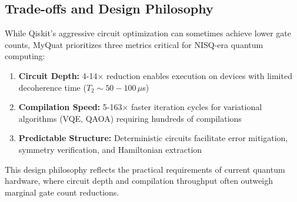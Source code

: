 \subsection{Trade-offs and Design Philosophy}

While Qiskit's aggressive circuit optimization can sometimes achieve lower gate 
counts, MyQuat prioritizes three metrics critical for NISQ-era quantum computing:

\begin{enumerate}
\item \textbf{Circuit Depth:} 4-14$\times$ reduction enables execution on 
      devices with limited decoherence time ($T_2 \sim 50-100\,\mu$s)
\item \textbf{Compilation Speed:} 5-163$\times$ faster iteration cycles for 
      variational algorithms (VQE, QAOA) requiring hundreds of compilations
\item \textbf{Predictable Structure:} Deterministic circuits facilitate error 
      mitigation, symmetry verification, and Hamiltonian extraction
\end{enumerate}

This design philosophy reflects the practical requirements of current quantum 
hardware, where circuit depth and compilation throughput often outweigh 
marginal gate count reductions.
